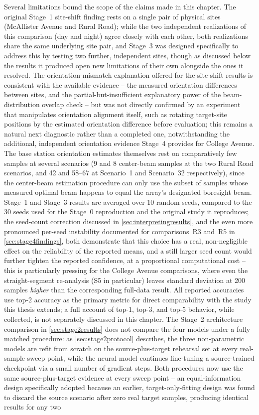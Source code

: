 \documentclass{iutbscthesis}
\begin{document}
Several limitations bound the scope of the claims made in this chapter. The original Stage~1 site-shift finding rests on a single pair of physical sites (McAllister Avenue and Rural Road); while the two independent realizations of this comparison (day and night) agree closely with each other, both realizations share the same underlying site pair, and Stage~3 was designed specifically to address this by testing two further, independent sites, though as discussed below the results it produced open new limitations of their own alongside the ones it resolved. The orientation-mismatch explanation offered for the site-shift results is consistent with the available evidence -- the measured orientation differences between sites, and the partial-but-insufficient explanatory power of the beam-distribution overlap check -- but was not directly confirmed by an experiment that manipulates orientation alignment itself, such as rotating target-site positions by the estimated orientation difference before evaluation; this remains a natural next diagnostic rather than a completed one, notwithstanding the additional, independent orientation evidence Stage~4 provides for College Avenue. The base station orientation estimates themselves rest on comparatively few samples at several scenarios (9 and 8 center-beam samples at the two Rural Road scenarios, and 42 and 58--67 at Scenario~1 and Scenario~32 respectively), since the center-beam estimation procedure can only use the subset of samples whose measured optimal beam happens to equal the array's designated boresight beam. Stage~1 and Stage~3 results are averaged over 10 random seeds, compared to the 30 seeds used for the Stage~0 reproduction and the original study it reproduces; the seed-count correction discussed in \autoref{sec:interpretingresults}, and the even more pronounced per-seed instability documented for comparisons~R3 and~R5 in \autoref{sec:stage4findings}, both demonstrate that this choice has a real, non-negligible effect on the reliability of the reported means, and a still larger seed count would further tighten the reported confidence, at a proportional computational cost -- this is particularly pressing for the College Avenue comparisons, where even the straight-segment re-analysis (S5 in particular) leaves standard deviation at 200 samples \emph{higher} than the corresponding full-data result. All reported accuracies use top-2 accuracy as the primary metric for direct comparability with the study this thesis extends; a full account of top-1, top-3, and top-5 behavior, while collected, is not separately discussed in this chapter. The Stage~2 architecture comparison in \autoref{sec:stage2results} does not compare the four models under a fully matched procedure: as \autoref{sec:stage2protocol} describes, the three non-parametric models are refit from scratch on the source-plus-target rehearsal set at every real-sample sweep point, while the neural model continues fine-tuning a source-trained checkpoint via a small number of gradient steps. Both procedures now use the same source-plus-target evidence at every sweep point -- an equal-information design specifically adopted because an earlier, target-only-fitting design was found to discard the source scenario after zero real target samples, producing identical results for any two 
\end{document}
